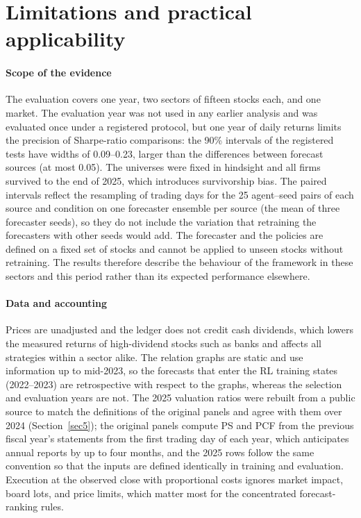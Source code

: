 \section{Limitations and practical applicability}\label{sec:limitations}

{\color{blue}\paragraph{Scope of the evidence}
The evaluation covers one year, two sectors of fifteen stocks each, and one market. The evaluation year was not used in any earlier analysis and was evaluated once under a registered protocol, but one year of daily returns limits the precision of Sharpe-ratio comparisons: the 90\% intervals of the registered tests have widths of 0.09--0.23, larger than the differences between forecast sources (at most 0.05). The universes were fixed in hindsight and all firms survived to the end of 2025, which introduces survivorship bias. The paired intervals reflect the resampling of trading days for the 25 agent--seed pairs of each source and condition on one forecaster ensemble per source (the mean of three forecaster seeds), so they do not include the variation that retraining the forecasters with other seeds would add. The forecaster and the policies are defined on a fixed set of stocks and cannot be applied to unseen stocks without retraining. The results therefore describe the behaviour of the framework in these sectors and this period rather than its expected performance elsewhere.

\paragraph{Data and accounting}
Prices are unadjusted and the ledger does not credit cash dividends, which lowers the measured returns of high-dividend stocks such as banks and affects all strategies within a sector alike. The relation graphs are static and use information up to mid-2023, so the forecasts that enter the RL training states (2022--2023) are retrospective with respect to the graphs, whereas the selection and evaluation years are not. The 2025 valuation ratios were rebuilt from a public source to match the definitions of the original panels and agree with them over 2024 (Section~\ref{sec5}); the original panels compute PS and PCF from the previous fiscal year's statements from the first trading day of each year, which anticipates annual reports by up to four months, and the 2025 rows follow the same convention so that the inputs are defined identically in training and evaluation. Execution at the observed close with proportional costs ignores market impact, board lots, and price limits, which matter most for the concentrated forecast-ranking rules.

}
